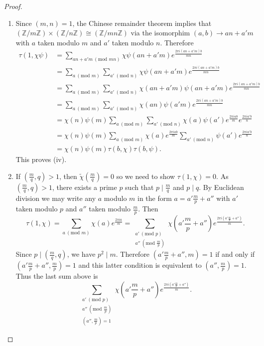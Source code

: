 \documentclass[12pt]{book}
\theoremstyle{definition}\newframedtheorem{method}{Method}
\newcommand{\tmod}[1]{\ \left(\text{mod }#1\right)}
\newcommand{\Z}{\mathbb{Z}}
\newcommand{\x}{\times}
\newcommand{\<}{\langle}
\renewcommand{\>}{\rangle}
\newcommand{\wtilde}{\widetilde}
\begin{document}
\begin{proof}
\begin{enumerate}[label=(\roman*)]
          \item Since $(m,n) = 1$, the Chinese remainder theorem implies that $(\Z/m\Z) \x (\Z/n\Z) \cong (\Z/mn\Z)$ via the isomorphim $(a,b) \to an+a'm$ with $a$ taken modulo $m$ and $a'$ taken modulo $n$. Therefore
          \begin{align*}
            \tau(1,\chi\psi) &= \sum_{an+a'm \tmod{mn}}\chi\psi(an+a'm)e^{\frac{2\pi i(an+a'm)b}{mn}} \\
            &= \sum_{a\tmod{m}}\sum_{a'\tmod{n}}\chi\psi(an+a'm)e^{\frac{2\pi i(an+a'm)b}{mn}} \\
            &= \sum_{a\tmod{m}}\sum_{a'\tmod{n}}\chi(an+a'm)\psi(an+a'm)e^{\frac{2\pi i(an+a'm)b}{mn}} \\
            &= \sum_{a\tmod{m}}\sum_{a'\tmod{n}}\chi(an)\psi(a'm)e^{\frac{2\pi i(an+a'm)b}{mn}} \\
            &= \chi(n)\psi(m)\sum_{a\tmod{m}}\sum_{a'\tmod{n}}\chi(a)\psi(a')e^{\frac{2\pi iab}{m}}e^{\frac{2\pi ia'b}{n}} \\
            &= \chi(n)\psi(m)\sum_{a\tmod{m}}\chi(a)e^{\frac{2\pi iab}{m}}\sum_{a'\tmod{n}}\psi(a')e^{\frac{2\pi ia'b}{n}} \\
            &= \chi(n)\psi(m)\tau(b,\chi)\tau(b,\psi).
          \end{align*}
          This proves (iv).
          \item If $\left(\frac{m}{q},q\right) > 1$, then $\wtilde{\chi}\left(\frac{m}{q}\right) = 0$ so we need to show $\tau(1,\chi) = 0$. As $\left(\frac{m}{q},q\right) > 1$, there exists a prime $p$ such that $p \mid \frac{m}{q}$ and $p \mid q$. By Euclidean division we may write any $a$ modulo $m$ in the form $a = a'\frac{m}{p}+a''$ with $a'$ taken modulo $p$ and $a''$ taken modulo $\frac{m}{p}$. Then
          \[
            \tau(1,\chi) = \sum_{a \tmod{m}}\chi(a)e^{\frac{2\pi ia}{m}} = \sum_{\substack{a' \tmod{p} \\ a'' \tmod{\frac{m}{p}}}}\chi\left(a'\frac{m}{p}+a''\right)e^{\frac{2\pi i\left(a'\frac{m}{p}+a''\right)}{m}}.
          \]
          Since $p \mid \left(\frac{m}{q},q\right)$, we have $p^{2} \mid m$. Therefore $\left(a'\frac{m}{p}+a'',m\right) = 1$ if and only if $\left(a'\frac{m}{p}+a'',\frac{m}{p}\right) = 1$ and this latter condition is equivalent to $\left(a'',\frac{m}{p}\right) = 1$. Thus the last sum above is
          \[
            \sum_{\substack{a' \tmod{p} \\ a'' \tmod{\frac{m}{p}} \\ \left(a'',\frac{m}{p}\right) = 1}}\chi\left(a'\frac{m}{p}+a''\right)e^{\frac{2\pi i\left(a'\frac{m}{p}+a''\right)}{m}}.
\]
\end{enumerate}
\end{proof}
\end{document}
